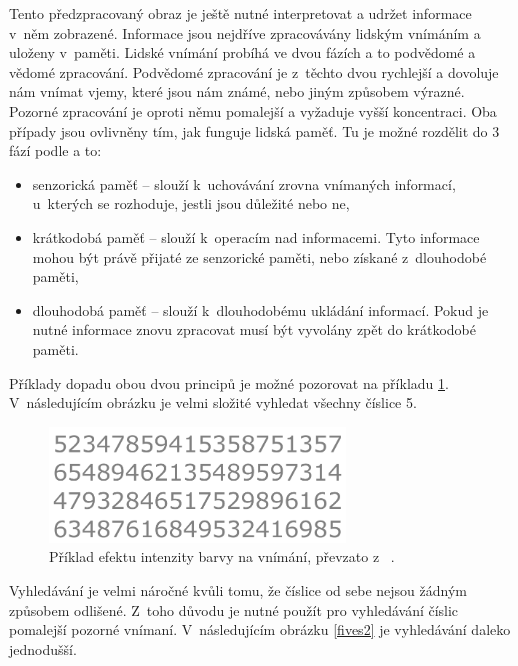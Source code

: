 Tento předzpracovaný obraz je ještě nutné interpretovat a udržet informace v~něm zobrazené. Informace jsou nejdříve zpracovávány lidským vnímáním a uloženy v~paměti. Lidské vnímání probíhá ve dvou fázích a to podvědomé a vědomé zpracování. Podvědomé zpracování je z~těchto dvou rychlejší a dovoluje nám vnímat vjemy, které jsou nám známé, nebo jiným způsobem výrazné. Pozorné zpracování je oproti němu pomalejší a vyžaduje vyšší koncentraci. Oba případy jsou ovlivněny tím, jak funguje lidská paměť. Tu je možné rozdělit do 3 fází podle \cite{Baddeley2007WorkingMT} a to:

\begin{itemize}
\item senzorická paměť -- slouží k~uchovávání zrovna vnímaných informací, u~kterých se rozhoduje, jestli jsou důležité nebo ne,

\item krátkodobá paměť -- slouží k~operacím nad informacemi. Tyto informace mohou být právě přijaté ze senzorické paměti, nebo získané z~dlouhodobé paměti,

\item dlouhodobá paměť -- slouží k~dlouhodobému ukládání informací. Pokud je nutné informace znovu zpracovat musí být vyvolány zpět do krátkodobé paměti.
\end{itemize}

Příklady dopadu obou dvou principů je možné pozorovat na příkladu \ref{fives}. V~následujícím obrázku je velmi složité vyhledat všechny číslice 5.

\begin{figure}[H]
\label{fives}
\begin{center}
    \includegraphics[width=0.7\textwidth]{obrazky-figures/fives.pdf}
\end{center}
\caption{Příklad efektu intenzity barvy na vnímání, převzato z~\cite{few2013information} .}
\end{figure}

Vyhledávání je velmi náročné kvůli tomu, že číslice od sebe nejsou žádným způsobem odlišené. Z~toho důvodu je nutné použít pro vyhledávání číslic pomalejší pozorné vnímaní. V~následujícím obrázku \ref{fives2} je vyhledávání daleko jednodušší.

